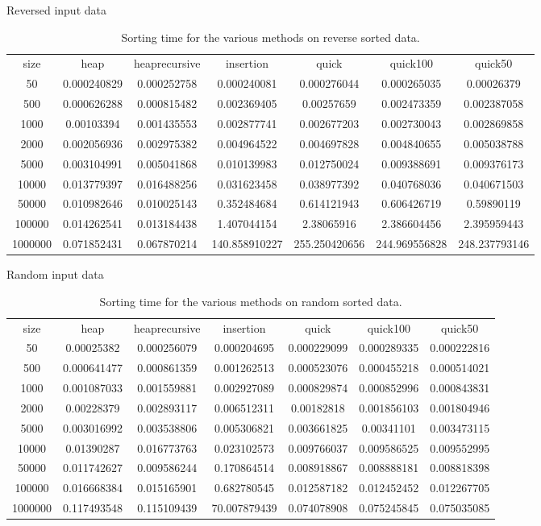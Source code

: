 \documentclass[a4paper,12pt]{article}
\begin{document}
\begin{table}[h]
\caption {Reversed input data} 
\begin{tabular}{ccccccc}
size & heap & heaprecursive & insertion & quick & quick100 & quick50 \\
50 & 0.000240829 & 0.000252758 & 0.000240081 & 0.000276044 & 0.000265035 & 0.00026379 \\
500 & 0.000626288 & 0.000815482 & 0.002369405 & 0.00257659 & 0.002473359 & 0.002387058 \\
1000 & 0.00103394 & 0.001435553 & 0.002877741 & 0.002677203 & 0.002730043 & 0.002869858 \\
2000 & 0.002056936 & 0.002975382 & 0.004964522 & 0.004697828 & 0.004840655 & 0.005038788 \\
5000 & 0.003104991 & 0.005041868 & 0.010139983 & 0.012750024 & 0.009388691 & 0.009376173 \\
10000 & 0.013779397 & 0.016488256 & 0.031623458 & 0.038977392 & 0.040768036 & 0.040671503 \\
50000 & 0.010982646 & 0.010025143 & 0.352484684 & 0.614121943 & 0.606426719 & 0.59890119 \\
100000 & 0.014262541 & 0.013184438 & 1.407044154 & 2.38065916 & 2.386604456 & 2.395959443 \\
1000000 & 0.071852431 & 0.067870214 & 140.858910227 & 255.250420656 & 244.969556828 & 248.237793146 \\
\end{tabular}
\caption{Sorting time for the various methods on reverse sorted data.}
\end{table}

\begin{table}[h]
\caption {Random input data} 
\begin{tabular}{ccccccc}
size & heap & heaprecursive & insertion & quick & quick100 & quick50 \\
50 & 0.00025382 & 0.000256079 & 0.000204695 & 0.000229099 & 0.000289335 & 0.000222816 \\
500 & 0.000641477 & 0.000861359 & 0.001262513 & 0.000523076 & 0.000455218 & 0.000514021 \\
1000 & 0.001087033 & 0.001559881 & 0.002927089 & 0.000829874 & 0.000852996 & 0.000843831 \\
2000 & 0.00228379 & 0.002893117 & 0.006512311 & 0.00182818 & 0.001856103 & 0.001804946 \\
5000 & 0.003016992 & 0.003538806 & 0.005306821 & 0.003661825 & 0.00341101 & 0.003473115 \\
10000 & 0.01390287 & 0.016773763 & 0.023102573 & 0.009766037 & 0.009586525 & 0.009552995 \\
50000 & 0.011742627 & 0.009586244 & 0.170864514 & 0.008918867 & 0.008888181 & 0.008818398 \\
100000 & 0.016668384 & 0.015165901 & 0.682780545 & 0.012587182 & 0.012452452 & 0.012267705 \\
1000000 & 0.117493548 & 0.115109439 & 70.007879439 & 0.074078908 & 0.075245845 & 0.075035085 \\
\end{tabular}
\caption{Sorting time for the various methods on random sorted data.}
\end{table}
\end{document}
